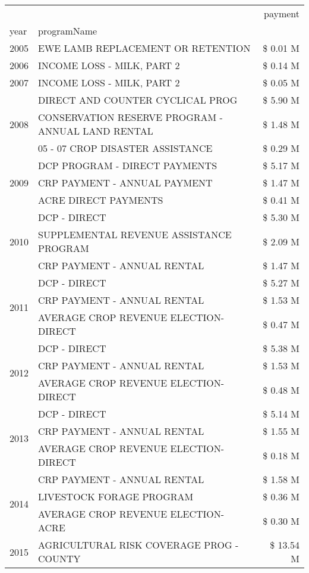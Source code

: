 \begin{tabular}{llr}
\toprule
 &  & payment \\
year & programName &  \\
\midrule
2005 & EWE LAMB REPLACEMENT OR RETENTION & \$ 0.01 M \\
\cline{1-3}
2006 & INCOME LOSS - MILK, PART 2 & \$ 0.14 M \\
\cline{1-3}
2007 & INCOME LOSS - MILK, PART 2 & \$ 0.05 M \\
\cline{1-3}
\multirow[t]{3}{*}{2008} & DIRECT AND COUNTER CYCLICAL PROG & \$ 5.90 M \\
 & CONSERVATION RESERVE PROGRAM - ANNUAL LAND RENTAL & \$ 1.48 M \\
 & 05 - 07 CROP DISASTER ASSISTANCE & \$ 0.29 M \\
\cline{1-3}
\multirow[t]{3}{*}{2009} & DCP PROGRAM - DIRECT PAYMENTS & \$ 5.17 M \\
 & CRP PAYMENT - ANNUAL PAYMENT & \$ 1.47 M \\
 & ACRE DIRECT PAYMENTS & \$ 0.41 M \\
\cline{1-3}
\multirow[t]{3}{*}{2010} & DCP - DIRECT & \$ 5.30 M \\
 & SUPPLEMENTAL REVENUE ASSISTANCE PROGRAM & \$ 2.09 M \\
 & CRP PAYMENT - ANNUAL RENTAL & \$ 1.47 M \\
\cline{1-3}
\multirow[t]{3}{*}{2011} & DCP - DIRECT & \$ 5.27 M \\
 & CRP PAYMENT - ANNUAL RENTAL & \$ 1.53 M \\
 & AVERAGE CROP REVENUE ELECTION-DIRECT & \$ 0.47 M \\
\cline{1-3}
\multirow[t]{3}{*}{2012} & DCP - DIRECT & \$ 5.38 M \\
 & CRP PAYMENT - ANNUAL RENTAL & \$ 1.53 M \\
 & AVERAGE CROP REVENUE ELECTION-DIRECT & \$ 0.48 M \\
\cline{1-3}
\multirow[t]{3}{*}{2013} & DCP - DIRECT & \$ 5.14 M \\
 & CRP PAYMENT - ANNUAL RENTAL & \$ 1.55 M \\
 & AVERAGE CROP REVENUE ELECTION-DIRECT & \$ 0.18 M \\
\cline{1-3}
\multirow[t]{3}{*}{2014} & CRP PAYMENT - ANNUAL RENTAL & \$ 1.58 M \\
 & LIVESTOCK FORAGE PROGRAM & \$ 0.36 M \\
 & AVERAGE CROP REVENUE ELECTION-ACRE & \$ 0.30 M \\
\cline{1-3}
\multirow[t]{3}{*}{2015} & AGRICULTURAL RISK COVERAGE PROG - COUNTY & \$ 13.54 M \\

\end{tabular}
